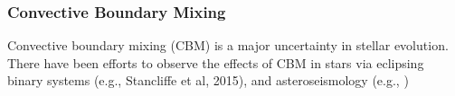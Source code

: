 {\color{purple}
\subsubsection{Convective Boundary Mixing}
}

Convective boundary mixing (CBM) is a major uncertainty in stellar evolution. There have been efforts to observe the effects of CBM in stars via eclipsing binary systems (e.g., Stancliffe et al, 2015), and asteroseismology (e.g., )

